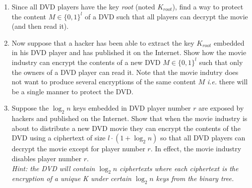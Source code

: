 \begin{enumerate}
	\item Since all DVD players have the key \emph{root} (noted $K_{root}$), 
	      find a way to protect the content $M\in\{0,1\}^l$ of a DVD such that all players can decrypt 
	      the movie (and then read it).
	\item Now suppose that a hacker has been able to extract the key $K_{root}$ embedded in his 
	      DVD player and has published it on the Internet. 
	      Show how the movie industry can encrypt the contents of a new DVD $M\in\{0,1\}^l$ such that only 
	      the owners of a DVD player can read it.
	      Note that the movie indutry does not want to produce several encryptions of the
	      same content $M$ \emph{i.e.} there will be a single manner to protect the DVD.
	\item Suppose the $\log_2n$ keys embedded in DVD player number $r$ are exposed by hackers 
	      and published on the Internet. Show that when the movie industry is about to 
	      distribute a new DVD movie they can encrypt the contents of the DVD using a 
	      ciphertext of size $l\!\cdot\!(1+\log_2n)$ so that all DVD players can decrypt the movie except
	      for player number $r$. In effect, the movie industry disables player number $r$.
	      \\
	      \emph{Hint: the DVD will contain $\log_2n$ ciphertexts where each ciphertext is the 
	      encryption of a unique K under certain $\log_2n$ keys from the binary tree.}
\end{enumerate}
